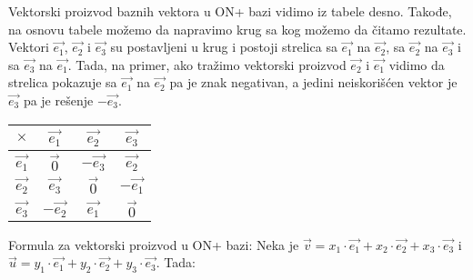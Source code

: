 \documentclass[12pt]{article}
\begin{document}
    \noindent
    \begin{minipage}{0.65\textwidth}
        \begin{flushleft}
            Vektorski proizvod baznih vektora u ON+ bazi vidimo iz tabele desno.
            Takođe, na osnovu tabele možemo da napravimo krug sa kog možemo da čitamo rezultate.
            Vektori $\overrightarrow{e_1}$, $\overrightarrow{e_2}$ i $\overrightarrow{e_3}$
            su postavljeni u krug i postoji strelica sa $\overrightarrow{e_1}$ na $\overrightarrow{e_2}$,
            sa $\overrightarrow{e_2}$ na $\overrightarrow{e_3}$ i sa $\overrightarrow{e_3}$ na $\overrightarrow{e_1}$.
            Tada, na primer, ako tražimo vektorski proizvod $\overrightarrow{e_2}$ i $\overrightarrow{e_1}$ vidimo da strelica
            pokazuje sa $\overrightarrow{e_1}$ na $\overrightarrow{e_2}$ pa je znak negativan, a jedini neiskorišćen vektor je
            $\overrightarrow{e_3}$ pa je rešenje $-\overrightarrow{e_3}$.
        \end{flushleft}
    \end{minipage}
    \hfill
    \begin{minipage}{0.3\textwidth}
        \centering
        \begin{tabular}{|c|c|c|c|}
            \hline
            $\times$               & $\overrightarrow{e_1}$  & $\overrightarrow{e_2}$  & $\overrightarrow{e_3}$  \\
            \hline
            $\overrightarrow{e_1}$ & $\overrightarrow{0}$    & $-\overrightarrow{e_3}$ & $\overrightarrow{e_2}$  \\
            \hline
            $\overrightarrow{e_2}$ & $\overrightarrow{e_3}$  & $\overrightarrow{0}$    & $-\overrightarrow{e_1}$ \\
            \hline
            $\overrightarrow{e_3}$ & $-\overrightarrow{e_2}$ & $\overrightarrow{e_1}$  & $\overrightarrow{0}$    \\
            \hline
        \end{tabular}
    \end{minipage}
    Formula za vektorski proizvod u ON+ bazi: Neka je $\overrightarrow{v}=x_1\cdot\overrightarrow{e_1}+x_2\cdot\overrightarrow{e_2}+x_3\cdot\overrightarrow{e_3}$ i
$\overrightarrow{u}=y_1\cdot\overrightarrow{e_1}+y_2\cdot\overrightarrow{e_2}+y_3\cdot\overrightarrow{e_3}$. Tada:
\end{document}
